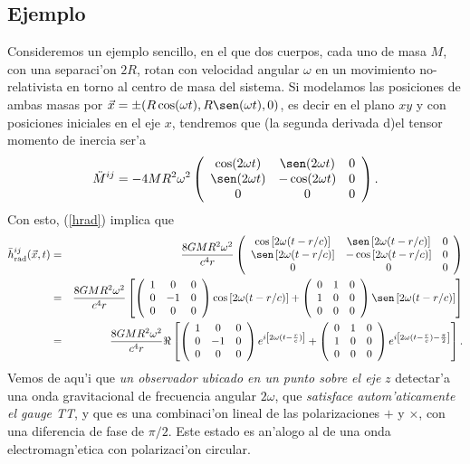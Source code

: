 \subsection{Ejemplo}
Consideremos un ejemplo sencillo, en el que dos cuerpos, cada uno de masa $M$, con una separaci'on $2R$, rotan con velocidad angular $\omega$ en un movimiento no-relativista en torno al centro de masa del sistema. Si modelamos las posiciones de ambas masas por $\vec{x}=\pm(R\cos(\omega t),R\sen(\omega t),0)$, es decir en el plano $xy$ y con posiciones iniciales en el eje $x$, tendremos que (la segunda derivada d)el tensor momento de inercia ser'a
\begin{equation}
 \ddot{M}^{ij}=-4MR^2\omega^2\left(
\begin{array}{ccc}
 \cos(2\omega t) & \sen(2\omega t) &0 \\
\sen(2\omega t) & -\cos(2\omega t) &0 \\
0&0&0
\end{array}\right).
\end{equation}
Con esto, (\ref{hrad}) implica que
\begin{eqnarray}
\bar{h}_{\rm rad}^{ij}(\vec{x},t)&=&\frac{8GMR^2\omega^2}{c^4r}\left(
\begin{array}{ccc}
 \cos\left[2\omega(t-r/c)\right] & \sen\left[2\omega(t-r/c)\right] &0\\
\sen\left[2\omega(t-r/c)\right] & -\cos\left[2\omega(t-r/c)\right] &0\\
0&0&0
\end{array}\right)\\
&=&\frac{8GMR^2\omega^2}{c^4r}\left[
\left(\begin{array}{ccc} 1 & 0 & 0\\ 0 & -1 &0 \\ 0&0&0\end{array}\right) \cos\left[2\omega(t-r/c)\right]
+\left(\begin{array}{ccc} 0 & 1 &0 \\ 1 & 0&0\\ 0&0&0\end{array}\right) \sen\left[2\omega(t-r/c)\right]
\right] \nonumber\\
&=&\frac{8GMR^2\omega^2}{c^4r}\Re\left[
\left(\begin{array}{ccc} 1 & 0 &0 \\ 0 & -1 &0 \\ 0&0&0\end{array}\right) e^{i\left[2\omega(t-\frac{r}{c})\right]} +\left(\begin{array}{ccc} 0 & 1 &0 \\ 1 & 0 &0 \\ 0&0&0\end{array}\right) e^{i\left[2\omega(t-\frac{r}{c})-\frac{\pi}{2}\right]}
\right] .
\end{eqnarray}
Vemos de aqu'i que \textit{un observador ubicado en un punto sobre el eje} $z$ detectar'a una onda gravitacional de frecuencia angular $2\omega$, que \textit{satisface autom'aticamente el gauge TT}, y que es una combinaci'on lineal de las polarizaciones $+$ y $\times$, con una diferencia de fase de $\pi/2$. Este estado es an'alogo al de una onda electromagn'etica con polarizaci'on circular.

